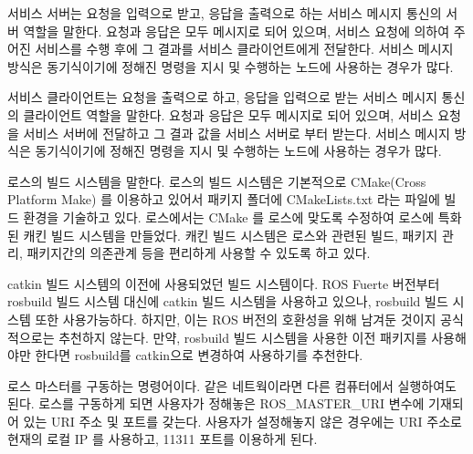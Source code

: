 \begin{definition}
서비스 서버는 요청을 입력으로 받고, 응답을 출력으로 하는 서비스 메시지 통신의 서버 역할을 말한다. 요청과 응답은 모두 메시지로 되어 있으며, 서비스 요청에 의하여 주어진 서비스를 수행 후에 그 결과를 서비스 클라이언트에게 전달한다. 서비스 메시지 방식은 동기식이기에 정해진 명령을 지시 및 수행하는 노드에 사용하는 경우가 많다.
\end{definition}

\begin{definition}
서비스 클라이언트는 요청을 출력으로 하고, 응답을 입력으로 받는 서비스 메시지 통신의 클라이언트 역할을 말한다. 요청과 응답은 모두 메시지로 되어 있으며, 서비스 요청을 서비스 서버에 전달하고 그 결과 값을 서비스 서버로 부터 받는다. 서비스 메시지 방식은 동기식이기에 정해진 명령을 지시 및 수행하는 노드에 사용하는 경우가 많다.
\end{definition}

\begin{definition}[캐킨(catkin)]
로스의 빌드 시스템을 말한다. 로스의 빌드 시스템은 기본적으로 CMake(Cross Platform Make) 를 이용하고 있어서 패키지 폴더에 CMakeLists.txt 라는 파일에 빌드 환경을 기술하고 있다. 로스에서는 CMake 를 로스에 맞도록 수정하여 로스에 특화된 캐킨 빌드 시스템을 만들었다. 캐킨 빌드 시스템은 로스와 관련된 빌드, 패키지 관리, 패키지간의 의존관계 등을 편리하게 사용할 수 있도록 하고 있다. 
\end{definition}

\begin{definition}
catkin 빌드 시스템의 이전에 사용되었던 빌드 시스템이다. ROS Fuerte 버전부터 rosbuild 빌드 시스템 대신에 catkin 빌드 시스템을 사용하고 있으나, rosbuild 빌드 시스템 또한 사용가능하다. 하지만, 이는 ROS 버전의 호환성을 위해 남겨둔 것이지 공식적으로는 추천하지 않는다. 만약, rosbuild 빌드 시스템을 사용한 이전 패키지를 사용해야만 한다면 rosbuild를 catkin으로 변경하여 사용하기를 추천한다. 
\end{definition}

\begin{definition}
로스 마스터를 구동하는 명령어이다. 같은 네트웍이라면 다른 컴퓨터에서 실행하여도 된다. 로스를 구동하게 되면 사용자가 정해놓은 ROS\_MASTER\_URI 변수에 기재되어 있는 URI 주소 및 포트를 갖는다. 사용자가 설정해놓지 않은 경우에는 URI 주소로 현재의 로컬 IP 를 사용하고, 11311 포트를 이용하게 된다.
\end{definition}

